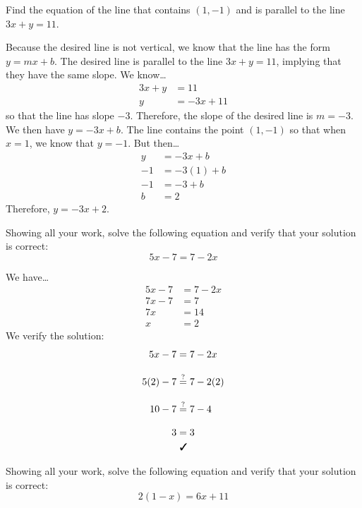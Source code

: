\documentclass[11pt,letterpaper]{article}
\begin{document}
\newpage



 Find the equation of the line that contains $(1, -1)$ and is parallel to the line $3x + y= 11$. \pspace

\sol Because the desired line is not vertical, we know that the line has the form $y= mx + b$. The desired line is parallel to the line $3x + y= 11$, implying that they have the same slope. We know\dots
	\[
	\begin{aligned}
	3x + y&= 11 \\[0.3cm]
	y&= -3x + 11
	\end{aligned}
	\]
so that the line has slope $-3$. Therefore, the slope of the desired line is $m= -3$. We then have $y= -3x + b$. The line contains the point $(1, -1)$ so that when $x= 1$, we know that $y= -1$. But then\dots
	\[
	\begin{aligned}
	y&= -3x + b \\[0.3cm]
	-1&= -3(1) + b \\[0.3cm]
	-1&= -3 + b \\[0.3cm]
	b&= 2
	\end{aligned}
	\]
Therefore, $y= -3x + 2$. 



\newpage



 Showing all your work, solve the following equation and verify that your solution is correct:
	\[
	5x - 7= 7 - 2x
	\] \pspace

\sol We have\dots
	\[
	\begin{aligned}
	5x - 7&= 7 - 2x \\[0.3cm]
	7x - 7&= 7 \\[0.3cm]
	7x&= 14 \\[0.3cm]
	x&= 2
	\end{aligned}
	\] \pspace
We verify the solution:
	\[
	\begin{aligned}
	5x - 7&= 7 - 2x \\[0.3cm]
	5(2) - 7&\stackrel{?}{=} 7 - 2(2) \\[0.3cm]
	10 - 7&\stackrel{?}{=} 7 - 4 \\[0.3cm]
	3&= 3 \\
	&\text{ \cmark}
	\end{aligned}
	\]



\newpage



 Showing all your work, solve the following equation and verify that your solution is correct:
	\[
	2(1 - x)= 6x + 11
	\] \pspace
\end{document}
